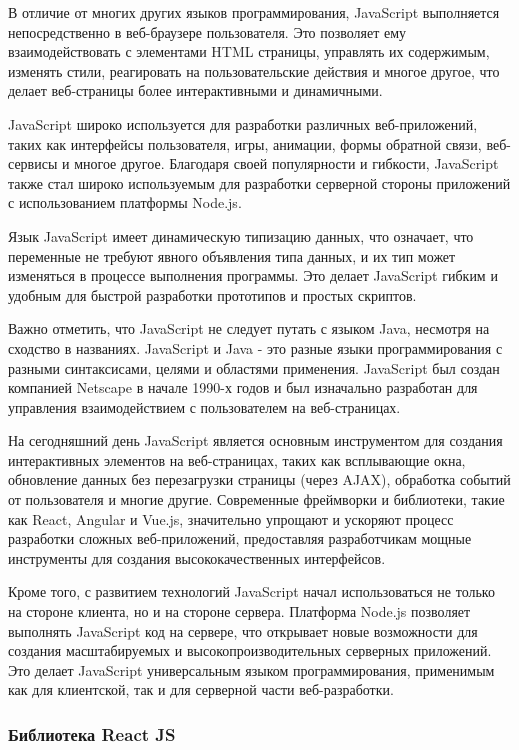В отличие от многих других языков программирования, JavaScript выполняется непосредственно в веб-браузере пользователя. Это позволяет ему взаимодействовать с элементами HTML страницы, управлять их содержимым, изменять стили, реагировать на пользовательские действия и многое другое, что делает веб-страницы более интерактивными и динамичными.

JavaScript широко используется для разработки различных веб-приложений, таких как интерфейсы пользователя, игры, анимации, формы обратной связи, веб-сервисы и многое другое. Благодаря своей популярности и гибкости, JavaScript также стал широко используемым для разработки серверной стороны приложений с использованием платформы Node.js.

Язык JavaScript имеет динамическую типизацию данных, что означает, что переменные не требуют явного объявления типа данных, и их тип может изменяться в процессе выполнения программы. Это делает JavaScript гибким и удобным для быстрой разработки прототипов и простых скриптов.

Важно отметить, что JavaScript не следует путать с языком Java, несмотря на сходство в названиях. JavaScript и Java - это разные языки программирования с разными синтаксисами, целями и областями применения. JavaScript был создан компанией Netscape в начале 1990-х годов и был изначально разработан для управления взаимодействием с пользователем на веб-страницах.

На сегодняшний день JavaScript является основным инструментом для создания интерактивных элементов на веб-страницах, таких как всплывающие окна, обновление данных без перезагрузки страницы (через AJAX), обработка событий от пользователя и многие другие. Современные фреймворки и библиотеки, такие как React, Angular и Vue.js, значительно упрощают и ускоряют процесс разработки сложных веб-приложений, предоставляя разработчикам мощные инструменты для создания высококачественных интерфейсов.

Кроме того, с развитием технологий JavaScript начал использоваться не только на стороне клиента, но и на стороне сервера. Платформа Node.js позволяет выполнять JavaScript код на сервере, что открывает новые возможности для создания масштабируемых и высокопроизводительных серверных приложений. Это делает JavaScript универсальным языком программирования, применимым как для клиентской, так и для серверной части веб-разработки.

\subsubsection{Библиотека React JS}

